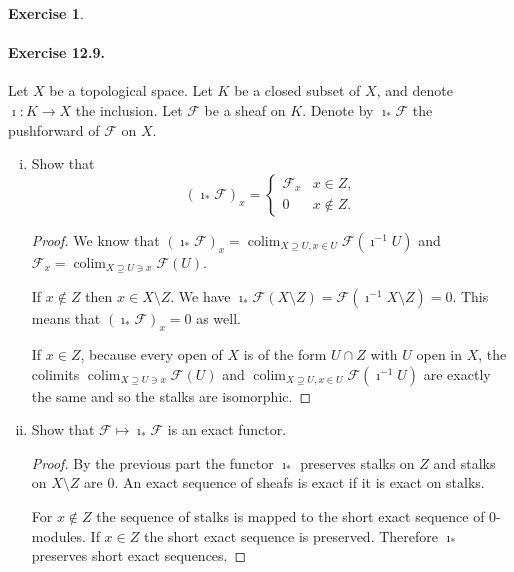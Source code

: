 \documentclass{article}
\newcommand{\FF}{\mathcal{F}}
\newcommand{\incl}{\imath}
\DeclareMathOperator{\colim}{colim}
\theoremstyle{definition}
\newtheorem{question}{Exercise}
\begin{document}
\begin{question}
    \paragraph{Exercise 12.9.}Let \(X\) be a topological space. Let \(K\) be a
    closed subset of \(X\), and denote \(\imath:K\to X\) the inclusion. Let
    \(\FF\) be a sheaf on \(K\). Denote by \(\imath_{*}\FF\) the pushforward of
    \(\FF\) on \(X\).

    \begin{enumerate}[(i)]
        \item Show that
              \[
                  (\incl_{*}\FF)_{x}=\begin{cases}
                      \FF_{x} & x\in Z,    \\
                      0       & x\notin Z.
                  \end{cases}
              \]

              \begin{proof}
                  We know that \((\incl_{*}\FF)_{x}=\colim_{X\supseteq
                      U,x\in U}\FF(\incl^{-1}U)\) and
                  \(\FF_{x}=\colim_{X\supseteq U\ni x}\FF(U)\).

                  If \(x\notin Z\) then \(x\in X\setminus Z\). We have
                  \(\incl_{*}\FF(X\setminus Z)=\FF(\incl^{-1}X\setminus Z)=0\).
                  This means that \((\incl_{*}\FF)_{x}=0\) as well.

                  If \(x\in Z\), because every open of \(X\) is of the form
                  \(U\cap Z\) with \(U\) open in \(X\), the colimits
                  \(\colim_{X\supseteq U\ni x}\FF(U)\) and \(\colim_{X\supseteq
                      U,x\in U}\FF(\incl^{-1}U)\) are exactly the same and so the
                  stalks are isomorphic.
              \end{proof}

        \item Show that \(\FF\mapsto\incl_{*}\FF\) is an exact functor.

              \begin{proof}
                  By the previous part the functor \(\incl_{*}\) preserves
                  stalks on \(Z\) and stalks on \(X\setminus Z\) are \(0\). An
                  exact sequence of sheafs is exact if it is exact on stalks.

                  For \(x\notin Z\) the sequence of stalks is mapped to the
                  short exact sequence of \(0\)-modules. If \(x\in Z\) the short
                  exact sequence is preserved. Therefore \(\incl_{*}\) preserves
                  short exact sequences.
              \end{proof}


\end{enumerate}
\end{question}
\end{document}
